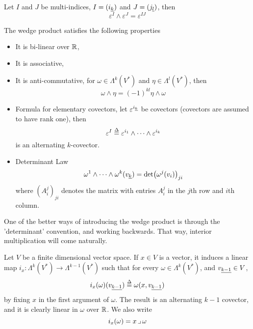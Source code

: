\documentclass[../main-manifolds.tex]{subfiles}
\begin{document}
\begin{wts}[Lemma 14.10]
    Let $I$ and $J$ be multi-indices, $I = (\Ul{i}[k])$ and $J = (\Ul{j}[l])$, then
    \begin{equation}
        \varepsilon^I\wedge\varepsilon^J = \varepsilon^{IJ}
    \end{equation}
\end{wts}

\begin{wts}\label{lee-chp14:lemma14.11}
    The wedge product satisfies the following properties
    \begin{itemize}
        \item It is bi-linear over $\mathbb{R}$,
        \item It is associative,
        \item It is anti-commutative, for $\omega\in\Lambda^k(V^*)$ and $\eta\in\Lambda^l(V^*)$, then
        \[
            \omega\wedge\eta = (-1)^{kl}\eta\wedge\omega
        \]
        \item Formula for elementary covectors, let $\varepsilon^{\Ul{i}[k]}$ be covectors (covectors are assumed to have rank one), then
        \[
        \varepsilon^I\overset{\Delta}{=} \varepsilon^{i_1}\wedge\cdots\wedge \varepsilon^{i_k}
        \]
        is an alternating $k$-covector.
        \item Determinant Law
        \[
            \omega^1\wedge\cdots\wedge \omega^k(\Ul{v}[k]) = \det(\omega^j(v_i))_{ji}
        \]
        where $(A^j_i)_{ji}$ denotes the matrix with entries $A^j_i$ in the $j$th row and $i$th column.
    \end{itemize}
\end{wts}

One of the better ways of introducing the wedge product is through the 'determinant' convention, and working backwards. That way, interior multiplication will come naturally.

\begin{definition}
    Let $V$ be a finite dimensional vector space.  If $x\in V$ is a vector, it induces a linear map $i_x: \Lambda^k(V^*)\to \Lambda^{k-1}(V^*)$ such that for every $\omega\in \Lambda^k(V^*)$, and $\Ul{v}[k-1]\in V$, 
    \[
        i_x(\omega)(\Ul{v}[k-1]) \defined \omega(x,\Ul{v}[k-1])
    \]
    by fixing $x$ in the first argument of $\omega$. The result is an alternating $k-1$ covector, and it is clearly linear in $\omega$ over $\mathbb{R}$. We also write
    \[
        i_x(\omega) = x\mathop{\lrcorner} \omega
    \]
\end{definition}
\end{document}
